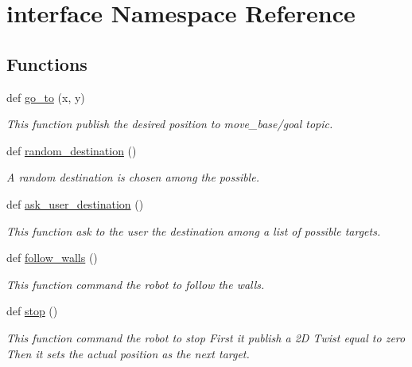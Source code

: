 \hypertarget{namespaceinterface}{}\section{interface Namespace Reference}
\label{namespaceinterface}
\subsection*{Functions}
\begin{DoxyCompactItemize}
\item 
def \hyperlink{namespaceinterface_a66f5ed4cd3345e5f1f4abe21259cf925}{go\+\_\+to} (x, y)
\begin{DoxyCompactList}\small\item\em This function publish the desired position to \textquotesingle{}move\+\_\+base/goal\textquotesingle{} topic. \end{DoxyCompactList}\item 
def \hyperlink{namespaceinterface_a77f849df9c7df3c30a5f806d8ed5803f}{random\+\_\+destination} ()
\begin{DoxyCompactList}\small\item\em A random destination is chosen among the possible. \end{DoxyCompactList}\item 
def \hyperlink{namespaceinterface_a1ba6fd083749b1aa01d230719ebffaf8}{ask\+\_\+user\+\_\+destination} ()
\begin{DoxyCompactList}\small\item\em This function ask to the user the destination among a list of possible targets. \end{DoxyCompactList}\item 
def \hyperlink{namespaceinterface_adb690fa0fc4d5c66808407e62379cfba}{follow\+\_\+walls} ()
\begin{DoxyCompactList}\small\item\em This function command the robot to follow the walls. \end{DoxyCompactList}\item 
def \hyperlink{namespaceinterface_a106ba8bd4a2bb1c8c1b073afb74cdfdd}{stop} ()
\begin{DoxyCompactList}\small\item\em This function command the robot to stop First it publish a 2D Twist equal to zero Then it sets the actual position as the next target. \end{DoxyCompactList}\item 

\end{DoxyCompactItemize}
